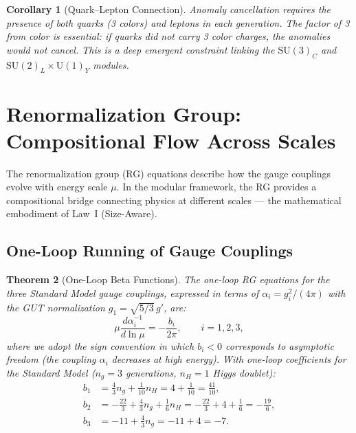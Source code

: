 \documentclass[12pt]{article}
\newtheorem{theorem}{Theorem}[section]
\newtheorem{corollary}[theorem]{Corollary}
\theoremstyle{definition}
\theoremstyle{remark}
\newcommand{\su}[1]{\mathrm{SU}(#1)}
\newcommand{\uu}[1]{\mathrm{U}(#1)}
\begin{document}
\begin{corollary}[Quark--Lepton Connection]
\label{cor:quark-lepton}
Anomaly cancellation requires the presence of both quarks (3 colors) and leptons in each generation. The factor of 3 from color is essential: if quarks did not carry 3 color charges, the anomalies would not cancel. This is a deep emergent constraint linking the $\su{3}_C$ and $\su{2}_L \times \uu{1}_Y$ modules.
\end{corollary}


\section{Renormalization Group: Compositional Flow Across Scales}
\label{sec:rge}

The renormalization group (RG) equations describe how the gauge couplings evolve with energy scale $\mu$. In the modular framework, the RG provides a compositional bridge connecting physics at different scales --- the mathematical embodiment of Law~I (Size-Aware).

\subsection{One-Loop Running of Gauge Couplings}

\begin{theorem}[One-Loop Beta Functions]
\label{thm:beta-functions}
The one-loop RG equations for the three Standard Model gauge couplings, expressed in terms of $\alpha_i = g_i^2/(4\pi)$ with the GUT normalization $g_1 = \sqrt{5/3}\, g'$, are:
\begin{equation}
\label{eq:rge}
\mu \frac{d\alpha_i^{-1}}{d\ln\mu} = -\frac{b_i}{2\pi}, \qquad i = 1, 2, 3,
\end{equation}
where we adopt the sign convention in which $b_i < 0$ corresponds to asymptotic freedom (the coupling $\alpha_i$ decreases at high energy). With one-loop coefficients for the Standard Model ($n_g = 3$ generations, $n_H = 1$ Higgs doublet):
\begin{align}
b_1 &= \frac{4}{3} n_g + \frac{1}{10} n_H = 4 + \frac{1}{10} = \frac{41}{10}, \\
b_2 &= -\frac{22}{3} + \frac{4}{3} n_g + \frac{1}{6} n_H = -\frac{22}{3} + 4 + \frac{1}{6} = -\frac{19}{6}, \\
b_3 &= -11 + \frac{4}{3} n_g = -11 + 4 = -7.
\end{align}
\end{theorem}
\end{document}

